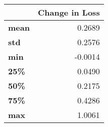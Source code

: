 \begin{tabular}{lr}
\toprule
{} &  Change in Loss \\
\midrule
\textbf{mean} &          0.2689 \\
\textbf{std } &          0.2576 \\
\textbf{min } &         -0.0014 \\
\textbf{25\% } &          0.0490 \\
\textbf{50\% } &          0.2175 \\
\textbf{75\% } &          0.4286 \\
\textbf{max } &          1.0061 \\
\bottomrule
\end{tabular}
